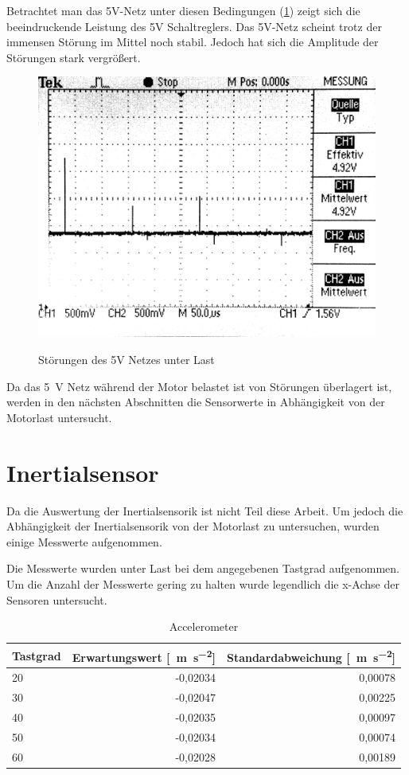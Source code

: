 Betrachtet man das 5V-Netz unter diesen Bedingungen (\cref{fig:5V_last}) zeigt sich die beeindruckende Leistung des 5V Schaltreglers.
Das 5V-Netz scheint trotz der immensen Störung im Mittel noch stabil. Jedoch hat sich die Amplitude der Störungen
stark vergrößert.

\begin{figure}[H]
\centering
\includegraphics[width=.8\textwidth]{5V_LAST.png}\\
\caption{Störungen des 5V Netzes unter Last}%
\label{fig:5V_last}
\end{figure}


Da das \SI{5}{\V} Netz während der Motor belastet ist von Störungen überlagert ist, werden in den nächsten Abschnitten die Sensorwerte in Abhängigkeit von der Motorlast untersucht.

\section{Inertialsensor}

Da die Auswertung der Inertialsensorik ist nicht Teil diese Arbeit. Um jedoch die Abhängigkeit der Inertialsensorik von der Motorlast
zu untersuchen, wurden einige Messwerte aufgenommen.

Die Messwerte wurden unter Last bei dem angegebenen Tastgrad aufgenommen. Um die Anzahl der Messwerte gering zu halten wurde legendlich die x-Achse der Sensoren untersucht.

\begin{table}[H]
  \centering
  \begin{tabularx}{\textwidth}{|X|r|r|}
    \hline
     Tastgrad & Erwartungswert [\SI{}{\metre\per\second\squared}] & Standardabweichung [\SI{}{\metre\per\second\squared}]  \\ \hline \hline
     20 & -0,02034  & 0,00078 \\ \hline
     30 & -0,02047  & 0,00225 \\ \hline
     40 & -0,02035  & 0,00097 \\ \hline
     50 & -0,02034  & 0,00074 \\ \hline
     60 & -0,02028  & 0,00189 \\ \hline
  \end{tabularx}
  \caption{Accelerometer}%
  \label{tab:acc}
\end{table}

